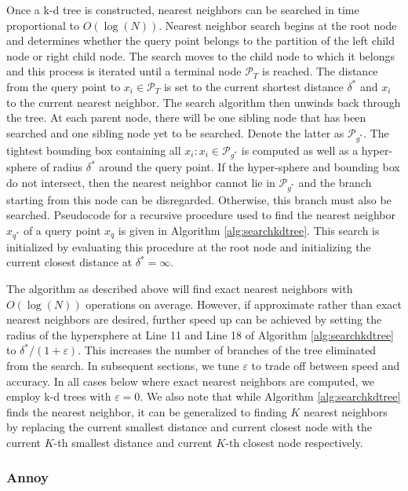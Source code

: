 \documentclass[12pt]{article}
\begin{document}
Once a k-d tree is constructed, nearest neighbors can be searched in time proportional to \(O(\log(N))\). Nearest neighbor search begins at the root node and determines whether the query point belongs to the partition of the left child node or right child node. The search moves to the child node to which it belongs and this process is iterated until a terminal node \(\mathcal{P}_T\) is reached. The distance from the query point to \(x_i\in\mathcal{P}_T\) is set to the current shortest distance \(\delta^*\) and \(x_i\) to the current nearest neighbor. The search algorithm then unwinds back through the tree. At each parent node, there will be one sibling node that has been searched and one sibling node yet to be searched. Denote the latter as \(\mathcal{P}_{g^*}\). The tightest bounding box containing all \(x_i:x_i\in\mathcal{P}_{g^*}\) is computed as well as a hyper-sphere of radius \(\delta^*\) around the query point. If the hyper-sphere and bounding box do not intersect, then the nearest neighbor cannot lie in \(\mathcal{P}_{g^*}\) and the branch starting from this node can be disregarded. Otherwise, this branch must also be searched. Pseudocode for a recursive procedure used to find the nearest neighbor \(x_{q^*}\) of a query point \(x_q\) is given in Algorithm \ref{alg:searchkdtree}. This search is initialized by evaluating this procedure at the root node and initializing the current closest distance at \(\delta^*=\infty\).

The algorithm as described above will find exact nearest neighbors with \(O(\log(N))\) operations on average. However, if approximate rather than exact nearest neighbors are desired, further speed up can be achieved by setting the radius of the hypersphere at Line 11 and Line 18 of Algorithm \ref{alg:searchkdtree} to \(\delta^*/(1+\varepsilon)\). This increases the number of branches of the tree eliminated from the search. In subsequent sections, we tune \(\varepsilon\) to trade off between speed and accuracy. In all cases below where exact nearest neighbors are computed, we employ k-d trees with \(\varepsilon=0\). We also note that while Algorithm \ref{alg:searchkdtree} finds the nearest neighbor, it can be generalized to finding \(K\) nearest neighbors by replacing the current smallest distance and current closest node with the current \(K\)-th smallest distance and current \(K\)-th closest node respectively.

\hypertarget{annoy}{%
\subsubsection*{Annoy}\label{annoy}}
\end{document}
